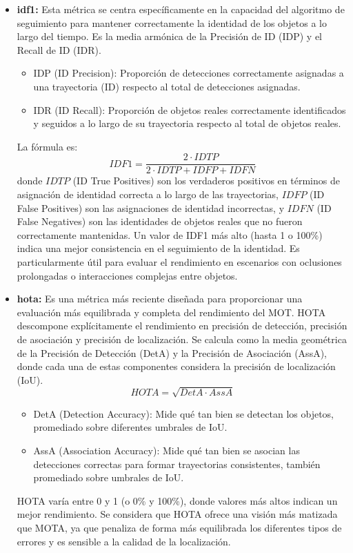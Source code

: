 \documentclass[11pt,spanish,listoffigures,listoftables]{tfgetsinf}
\begin{document}
\begin{itemize}
   \item \textbf{\gls{idf1}:} Esta métrica se centra específicamente en la capacidad del algoritmo de seguimiento para mantener correctamente la identidad de los objetos a lo largo del tiempo. Es la media armónica de la Precisión de ID (IDP) y el Recall de ID (IDR).
   \begin{itemize}
     \item IDP (ID Precision): Proporción de detecciones correctamente asignadas a una trayectoria (ID) respecto al total de detecciones asignadas.
     \item IDR (ID Recall): Proporción de objetos reales correctamente identificados y seguidos a lo largo de su trayectoria respecto al total de objetos reales.
   \end{itemize}
   La fórmula es:
   \begin{equation}
   IDF1 = \frac{2 \cdot IDTP}{2 \cdot IDTP + IDFP + IDFN}
   \end{equation}
   donde \(IDTP\) (ID True Positives) son los verdaderos positivos en términos de asignación de identidad correcta a lo largo de las trayectorias, \(IDFP\) (ID False Positives) son las asignaciones de identidad incorrectas, y \(IDFN\) (ID False Negatives) son las identidades de objetos reales que no fueron correctamente mantenidas. Un valor de IDF1 más alto (hasta 1 o 100\%) indica una mejor consistencia en el seguimiento de la identidad. Es particularmente útil para evaluar el rendimiento en escenarios con oclusiones prolongadas o interacciones complejas entre objetos.

   \item \textbf{\gls{hota}:} Es una métrica más reciente diseñada para proporcionar una evaluación más equilibrada y completa del rendimiento del MOT. HOTA descompone explícitamente el rendimiento en precisión de detección, precisión de asociación y precisión de localización. Se calcula como la media geométrica de la Precisión de Detección (DetA) y la Precisión de Asociación (AssA), donde cada una de estas componentes considera la precisión de localización (IoU).
   \begin{equation}
   HOTA = \sqrt{DetA \cdot AssA}
   \end{equation}
   \begin{itemize}
     \item DetA (Detection Accuracy): Mide qué tan bien se detectan los objetos, promediado sobre diferentes umbrales de IoU.
     \item AssA (Association Accuracy): Mide qué tan bien se asocian las detecciones correctas para formar trayectorias consistentes, también promediado sobre umbrales de IoU.
   \end{itemize}
   HOTA varía entre 0 y 1 (o 0\% y 100\%), donde valores más altos indican un mejor rendimiento. Se considera que HOTA ofrece una visión más matizada que MOTA, ya que penaliza de forma más equilibrada los diferentes tipos de errores y es sensible a la calidad de la localización.


\end{itemize}
\end{document}
